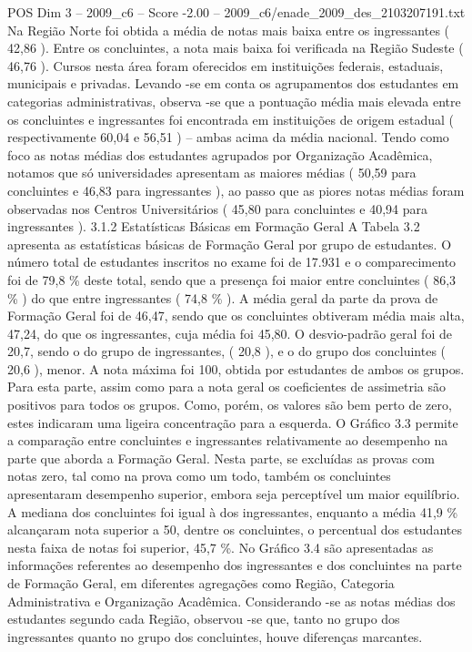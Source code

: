 \begin{textsample}{POS Dim 3 – 2009\_c6 – Score -2.00 – 2009\_c6/enade\_2009\_des\_2103207191.txt}
Na Região Norte foi obtida a média de notas mais baixa entre os ingressantes ( 42,86 ).
Entre os concluintes, a nota mais baixa foi verificada na Região Sudeste ( 46,76 ).
Cursos nesta área foram oferecidos em instituições federais, estaduais, municipais e privadas.
Levando -se em conta os agrupamentos dos estudantes em categorias administrativas, observa -se que a pontuação média mais elevada entre os concluintes e ingressantes foi encontrada em instituições de origem estadual ( respectivamente 60,04 e 56,51 ) – ambas acima da média nacional.
Tendo como foco as notas médias dos estudantes agrupados por Organização Acadêmica, notamos que só universidades apresentam as maiores médias ( 50,59 para concluintes e 46,83 para ingressantes ), ao passo que as piores notas médias foram observadas nos Centros Universitários ( 45,80 para concluintes e 40,94 para ingressantes ). 3.1.2 Estatísticas Básicas em Formação Geral A Tabela 3.2 apresenta as estatísticas básicas de Formação Geral por grupo de estudantes.
O número total de estudantes inscritos no exame foi de 17.931 e o comparecimento foi de 79,8 \% deste total, sendo que a presença foi maior entre concluintes ( 86,3 \% ) do que entre ingressantes ( 74,8 \% ).
A média geral da parte da prova de Formação Geral foi de 46,47, sendo que os concluintes obtiveram média mais alta, 47,24, do que os ingressantes, cuja média foi 45,80.
O desvio-padrão geral foi de 20,7, sendo o do grupo de ingressantes, ( 20,8 ), e o do grupo dos concluintes ( 20,6 ), menor.
A nota máxima foi 100, obtida por estudantes de ambos os grupos.
Para esta parte, assim como para a nota geral os coeficientes de assimetria são positivos para todos os grupos.
Como, porém, os valores são bem perto de zero, estes indicaram uma ligeira concentração para a esquerda.
O Gráfico 3.3 permite a comparação entre concluintes e ingressantes relativamente ao desempenho na parte que aborda a Formação Geral.
Nesta parte, se excluídas as provas com notas zero, tal como na prova como um todo, também os concluintes apresentaram desempenho superior, embora seja perceptível um maior equilíbrio.
A mediana dos concluintes foi igual à dos ingressantes, enquanto a média 41,9 \% alcançaram nota superior a 50, dentre os concluintes, o percentual dos estudantes nesta faixa de notas foi superior, 45,7 \%.
No Gráfico 3.4 são apresentadas as informações referentes ao desempenho dos ingressantes e dos concluintes na parte de Formação Geral, em diferentes agregações como Região, Categoria Administrativa e Organização Acadêmica.
Considerando -se as notas médias dos estudantes segundo cada Região, observou -se que, tanto no grupo dos ingressantes quanto no grupo dos concluintes, houve diferenças marcantes.

\end{textsample}
